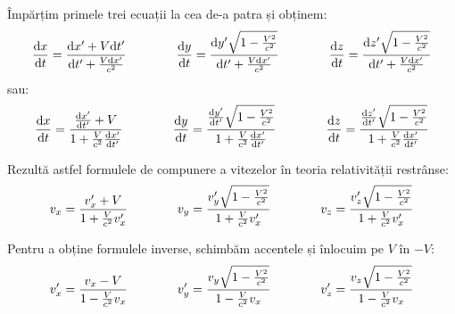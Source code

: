 Împărțim primele trei ecuații la cea de-a patra și obținem:
\begin{equation*}
    \begin{aligned}[t]
        \dv{x}{t} = \frac{\dd x' + V\dd t'}{\dd t' + \frac{V\dd x'}{c^2}}
    \end{aligned}\qquad\qquad
    \begin{aligned}[t]
        \dv{y}{t} = \frac{\dd y'\sqrt{1 - \frac{V^2}{c^2}}}{\dd t' + \frac{V\dd x'}{c^2}}
    \end{aligned}\qquad\qquad
    \begin{aligned}[t]
        \dv{z}{t} = \frac{\dd z'\sqrt{1 - \frac{V^2}{c^2}}}{\dd t' + \frac{V\dd x'}{c^2}}
    \end{aligned}
\end{equation*}
sau:
\begin{equation*}
    \begin{aligned}[t]
        \dv{x}{t} = \frac{\dv{x'}{t'} + V}{1 + \frac{V}{c^2}\dv{x'}{t'}}
    \end{aligned}\qquad\qquad
    \begin{aligned}[t]
        \dv{y}{t} = \frac{\dv{y'}{t'}\sqrt{1 - \frac{V^2}{c^2}}}{1 + \frac{V}{c^2}\dv{x'}{t'}}
    \end{aligned}\qquad\qquad
    \begin{aligned}[t]
        \dv{z}{t} = \frac{\dv{z'}{t'}\sqrt{1 - \frac{V^2}{c^2}}}{1 + \frac{V}{c^2}\dv{x'}{t'}}
    \end{aligned}
\end{equation*}

Rezultă astfel formulele de compunere a vitezelor în teoria relativității
restrânse:
\begin{equation*}
    \begin{aligned}[t]
        v_x = \frac{v_x' + V}{1 + \frac{V}{c^2}v_x'}
    \end{aligned}\qquad\qquad
    \begin{aligned}[t]
        v_y = \frac{v_y'\sqrt{1 - \frac{V^2}{c^2}}}{1 + \frac{V}{c^2}v_x'}
    \end{aligned}\qquad\qquad
    \begin{aligned}[t]
        v_z = \frac{v_z'\sqrt{1 - \frac{V^2}{c^2}}}{1 + \frac{V}{c^2}v_x'}
    \end{aligned}
\end{equation*}

Pentru a obține formulele inverse, schimbăm accentele și înlocuim pe $V$ în
$-V$:
\begin{equation*}
    \begin{aligned}[t]
        v_x' = \frac{v_x - V}{1 - \frac{V}{c^2}v_x}
    \end{aligned}\qquad\qquad
    \begin{aligned}[t]
        v_y' = \frac{v_y\sqrt{1 - \frac{V^2}{c^2}}}{1 - \frac{V}{c^2}v_x}
    \end{aligned}\qquad\qquad
    \begin{aligned}[t]
        v_z' = \frac{v_z\sqrt{1 - \frac{V^2}{c^2}}}{1 - \frac{V}{c^2}v_x}
    \end{aligned}
\end{equation*}

